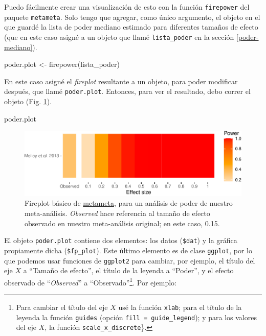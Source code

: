 \documentclass[
  bookmarksnumbered]{article}
\newenvironment{Shaded}{\begin{snugshade}}{\end{snugshade}}
\newcommand{\FunctionTok}[1]{\textcolor[rgb]{0.39,0.29,0.61}{#1}}
\newcommand{\NormalTok}[1]{\textcolor[rgb]{0.12,0.11,0.11}{#1}}
\newcommand{\OtherTok}[1]{\textcolor[rgb]{0.00,0.43,0.16}{#1}}
\begin{document}
Puedo fácilmente crear una visualización de esto con la función \texttt{firepower} del paquete \texttt{metameta}. Solo tengo que agregar, como único argumento, el objeto en el que guardé la lista de poder mediano estimado para diferentes tamaños de efecto (que en este caso asigné a un objeto que llamé \texttt{lista\_poder} en la sección \ref{poder-mediano}).

\begin{Shaded}
\begin{Highlighting}[]
\NormalTok{poder.plot }\OtherTok{\textless{}{-}} \FunctionTok{firepower}\NormalTok{(lista\_poder)}
\end{Highlighting}
\end{Shaded}

En este caso asigné el \emph{fireplot} resultante a un objeto, para poder modificar después, que llamé \texttt{poder.plot}. Entonces, para ver el resultado, debo correr el objeto (Fig. \ref{fig:fire-plot1}).

\begin{Shaded}
\begin{Highlighting}[]
\NormalTok{poder.plot}
\end{Highlighting}
\end{Shaded}

\begin{figure}
\centering
\includegraphics{Meta-analysis_files/figure-latex/fire-plot1-1.pdf}
\caption{\label{fig:fire-plot1}Fireplot básico de \href{https://www.dsquintana.blog/metameta-r-package-meta-analysis/}{metameta}, para un análisis de poder de nuestro meta-análisis. \emph{Observed} hace referencia al tamaño de efecto observado en nuestro meta-análisis original; en este caso, 0.15.}
\end{figure}

El objeto \texttt{poder.plot} contiene dos elementos: los datos (\texttt{\$dat}) y la gráfica propiamente dicha (\texttt{\$fp\_plot}). Este último elemento es de clase \texttt{ggplot}, por lo que podemos usar funciones de \texttt{ggplot2} para cambiar, por ejemplo, el título del eje \(X\) a ``Tamaño de efecto'', el título de la leyenda a ``Poder'', y el efecto observado de ``\emph{Observed}'' a ``Observado''\footnote{Para cambiar el título del eje \(X\) usé la función \texttt{xlab}; para el título de la leyenda la función \texttt{guides} (opción \texttt{fill\ =\ guide\_legend}); y para los valores del eje \(X\), la función \texttt{scale\_x\_discrete}\}.}. Por ejemplo:
\end{document}
